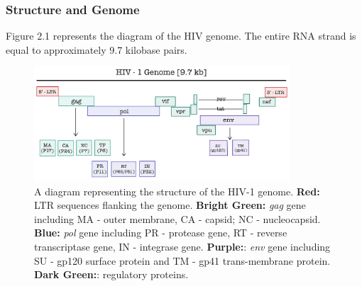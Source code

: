     \subsubsection{Structure and Genome}

Figure 2.1 represents the diagram of the HIV genome. 
The entire RNA strand is equal to approximately 9.7 kilobase pairs.


\begin{figure}[h]
  \centering
  \includegraphics[width=0.85\textwidth]{images/hiv genome.jpg}
  \caption{A diagram representing the structure of the HIV-1 genome. \textbf{Red:} LTR sequences flanking the genome. \textbf{Bright Green:} \textit{gag} gene including MA - outer membrane, CA - capsid; NC - nucleocapsid. \textbf{Blue:}
  \textit{pol} gene including PR - protease gene, RT - reverse transcriptase gene, IN - integrase gene. \textbf{Purple:}:
  \textit{env} gene including SU - gp120 surface protein and TM - gp41 trans-membrane protein. \textbf{Dark Green:}: regulatory proteins.}
  \label{fig: HIV -1 genome}
\end{figure}

